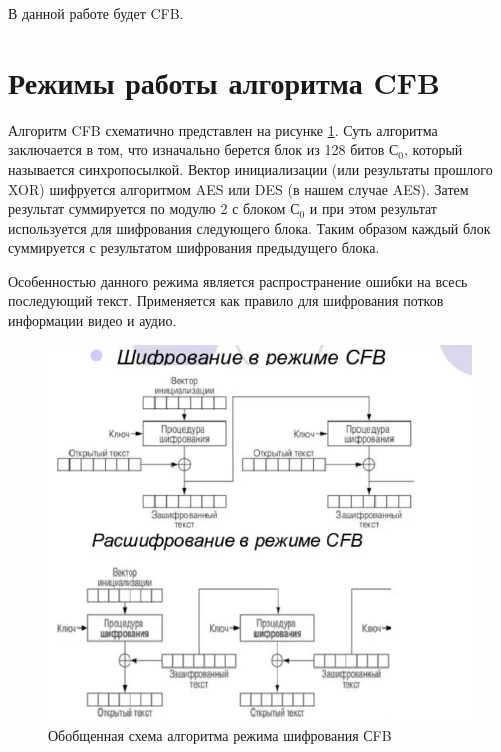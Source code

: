 В данной работе будет CFB.

\section{Режимы работы алгоритма CFB}

Алгоритм CFB схематично представлен на рисунке \ref{fig:cfb}.
Суть алгоритма заключается в том, что изначально берется блок из 128 битов \(С_0\), который называется синхропосылкой. 
Вектор инициализации (или результаты прошлого XOR) шифруется алгоритмом AES или DES (в нашем случае AES). 
Затем результат суммируется по модулю 2 с блоком \(С_0\) и при этом результат используется для шифрования следующего блока.
Таким образом каждый блок суммируется с результатом шифрования предыдущего блока.

Особенностью данного режима является распространение ошибки на всесь последующий текст.
Применяется как правило для шифрования потков информации видео и аудио.

\begin{figure}[ht!]
	\centering
	\includegraphics[width=0.9\linewidth]{img/cfb.png}
	\caption{Обобщенная схема алгоритма режима шифрования СFB}
	\label{fig:cfb}
\end{figure}